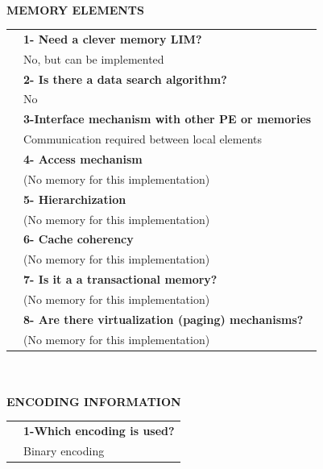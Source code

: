\newpage{\large \textbf{\qquad }}\vspace{10pt}\\
{\large \textbf{MEMORY ELEMENTS}}\vspace{10pt}\\\begin{tabular}{ p{0.2cm} p{14.5cm}}
	&\textbf{1- Need a clever memory LIM?}\\
	&	No, but can be implemented\vspace{7pt}\\
	&\textbf{2- Is there a data search algorithm?}\\
	&	No\vspace{7pt}\\
	&\textbf{	3-Interface mechanism with other PE or memories}\\
	&	Communication required between local elements\vspace{7pt}\\
	&	\textbf{4- Access mechanism}\\
	&	(No memory for this implementation)\vspace{7pt}\\
	&	\textbf{5- Hierarchization} \\
	&	(No memory for this implementation)\vspace{7pt}\\
	&\textbf{	6- Cache coherency} \\
	&	(No memory for this implementation)\vspace{7pt}\\
	&\textbf{	7- Is it a a transactional memory?}\\
	&	(No memory for this implementation)\vspace{7pt}\\
	&\textbf{	8- Are there virtualization (paging) mechanisms?}\\
	&	(No memory for this implementation)\end{tabular}\vspace{14pt}\\
\vspace{10pt}\\
{\large\textbf{ENCODING INFORMATION}}\vspace{10pt}\\
\begin{tabular}{ p{0.2cm} p{14.5cm}}
	&\textbf{1-Which encoding is used?}\\
	&Binary encoding
\end{tabular}
\newpage{\large\textbf{ }}\vspace{10pt}\\
